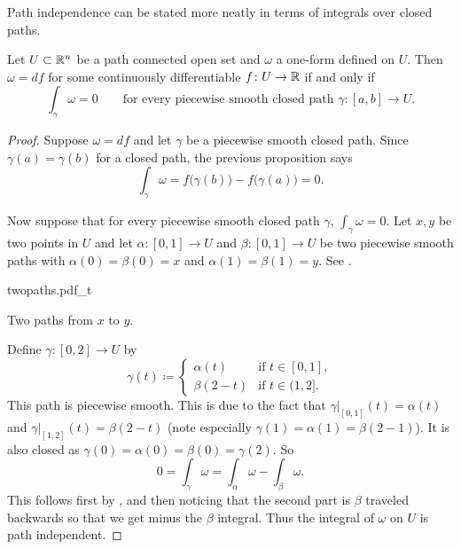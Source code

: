 Path independence can be stated more neatly in terms of integrals over
closed paths.

\begin{prop}
Let $U \subset {\mathbb{R}}^n$ be a path connected open set and $\omega$
a one-form defined on $U$.
Then $\omega = df$ for some continuously differentiable $f \colon U \to
{\mathbb{R}}$ if and only if
\begin{equation*}
\int_{\gamma} \omega = 0
\qquad
\text{for every piecewise smooth closed path } \gamma \colon [a,b] \to U.
\end{equation*}
\end{prop}

\begin{proof}
Suppose $\omega = df$ and let $\gamma$ be a piecewise smooth
closed path.  
Since $\gamma(a) = \gamma(b)$ for a closed path,
the previous proposition says
\begin{equation*}
\int_{\gamma} \omega = f\bigl(\gamma(b)\bigr) - f\bigl(\gamma(a)\bigr) = 0 .
\end{equation*}

Now suppose that for every piecewise smooth closed path $\gamma$, $\int_{\gamma} \omega = 0$.
Let $x,y$ be two points in $U$ and let $\alpha \colon [0,1] \to U$ and
$\beta \colon [0,1] \to U$ be two piecewise smooth paths with $\alpha(0) = \beta(0) = x$
and $\alpha(1) = \beta(1) = y$.  See .
\begin{myfigureht}
{twopaths.pdf_t}
\caption{Two paths from $x$ to $y$.\label{fig:twopaths}}
\end{myfigureht}

Define $\gamma \colon [0,2] \to U$ by
\begin{equation*}
\gamma(t) \coloneqq
\begin{cases}
\alpha(t)  & \text{if } t \in [0,1], \\
\beta(2-t) & \text{if } t \in (1,2].
\end{cases}
\end{equation*}
This path is piecewise smooth.  This is due to the fact that
$\gamma|_{[0,1]}(t) = \alpha(t)$ and
$\gamma|_{[1,2]}(t) = \beta(2-t)$ (note especially $\gamma(1) = \alpha(1) =
\beta(2-1)$).
It is also closed as $\gamma(0) = \alpha(0) = \beta(0) = \gamma(2)$.
So 
\begin{equation*}
0 = \int_{\gamma} \omega = \int_{\alpha} \omega - \int_{\beta} \omega .
\end{equation*}
This follows first by , and then noticing that
the second part is $\beta$ traveled backwards so that we get minus the
$\beta$ integral.  Thus the integral of $\omega$ on $U$ is path independent.
\end{proof}

